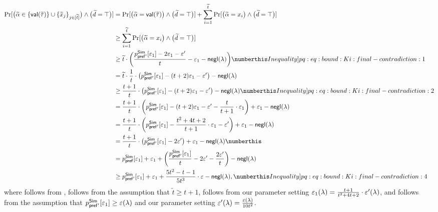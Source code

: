 \begin{align*}
\Pr[\big(\tilde{\alpha} \in \Set{\msf{val}(\tilde{\tau})} \cup \Set{\tilde{x}_j}_{j \in [\tilde{t}]}\big) \wedge \big(\tilde{d} = \top\big)] 
& = 
\Pr[\big(\tilde{\alpha} = \msf{val}(\tilde{\tau})\big) \wedge \big(\tilde{d} = \top\big) ] + 
\sum_{i =1 }^{\tilde{t}} \Pr[\big(\tilde{\alpha} = x_i\big) \wedge \big(\tilde{d} = \top\big)] \\
& \ge  
\sum_{i =1 }^{\tilde{t}} \Pr[\big(\tilde{\alpha} = x_i\big) \wedge \big(\tilde{d} = \top\big)] \\
&\ge 
\tilde{t} \cdot 
\bigg(
\frac{p^{\msf{Sim}}_{\msf{pref}'}[\epsilon_1]-2\epsilon_1 - \epsilon'}{t} - \epsilon_1- \negl(\secpar) 
\bigg)\numberthis \label[Inequality]{pq:eq:bound:Ki:final-contradiction:1}\\
& = 
\tilde{t} \cdot \frac{1}{t}\cdot \big( p^{\msf{Sim}}_{\msf{pref}'}[\epsilon_1]-(t+2)\epsilon_1 - \epsilon' \big) - \negl(\secpar)\\ 
& \ge 
\frac{t+1}{t} \cdot \big(p^{\msf{Sim}}_{\msf{pref}'}[\epsilon_1]-(t+2)\epsilon_1 - \epsilon'\big) - \negl(\secpar) \numberthis \label[Inequality]{pq:eq:bound:Ki:final-contradiction:2}\\
& = 
\frac{t+1}{t} \cdot \bigg( p^{\msf{Sim}}_{\msf{pref}'}[\epsilon_1]-(t+2)\epsilon_1 - \epsilon' - \frac{t}{t+1} \cdot\epsilon_1\bigg) + \epsilon_1 - \negl(\secpar)\\
& =
\frac{t+1}{t} \cdot \bigg( p^{\msf{Sim}}_{\msf{pref}'}[\epsilon_1]-\frac{t^2+4t+2}{t+1}\cdot\epsilon_1 - \epsilon' \bigg) + \epsilon_1 - \negl(\secpar)\\
& = 
\frac{t+1}{t} \cdot \big(p^{\msf{Sim}}_{\msf{pref}'}[\epsilon_1]- 2\epsilon'\big)+ \epsilon_1 - \negl(\secpar) \numberthis \label{pq:eq:bound:Ki:final-contradiction:3}\\
& = 
p_{\msf{pref}}^{\msf{Sim}}[\epsilon_1]+ \epsilon_1 + \bigg(\frac{p^{\msf{Sim}}_{\msf{pref}'}[\epsilon_1]}{t} - 2\epsilon' - \frac{2\epsilon'}{t}\bigg) - \negl(\secpar) \\
& \ge p^{\msf{Sim}}_{\msf{pref}'}[\epsilon_1]+ \epsilon_1 + \frac{5t^2 - t -1}{5t^3}\cdot \epsilon - \negl(\secpar), \numberthis \label[Inequality]{pq:eq:bound:Ki:final-contradiction:4}\\
\end{align*}
where  follows from ,  follows from the assumption that $\tilde{t} \ge t+1$,  follows from our parameter setting $\varepsilon_1(\lambda)=\frac{t+1}{t^2+4t+2}\cdot \varepsilon'(\lambda)$,  
and  follows from the assumption that $p^{\mathsf{Sim}}_{\mathsf{pref}'}[\varepsilon_1] \ge \varepsilon(\lambda)$ and our parameter setting $\varepsilon'(\lambda) = \frac{\varepsilon(\lambda)}{10t^2}$.

